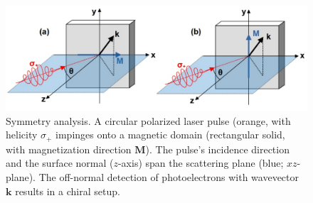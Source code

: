 \documentclass[prl,twocolumn,floatfix]{revtex4-2}
\renewcommand{\vec}[1]{\boldsymbol{#1}}
\newcommand{\rework}[1]{{\color{blue}{#1}}}
\begin{document}
\begin{figure}
    \centering
    \includegraphics[width = \columnwidth]{symmetry}
    \caption{Symmetry analysis. A circular polarized laser pulse (orange, with helicity $\sigma_{+}$ impinges onto a magnetic domain (rectangular solid, with magnetization direction $\vec{M}$). The pulse's incidence direction and the surface normal ($z$-axis) span the scattering plane (blue; $xz$-plane). The off-normal detection of photoelectrons with wavevector $\vec{k}$ results in a chiral setup. 
    }
    \label{fig:symmetry}
\end{figure}
\end{document}
